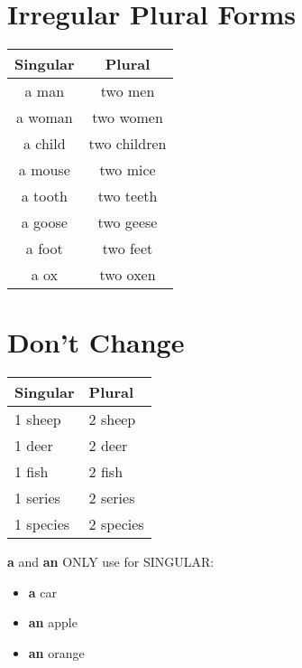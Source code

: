 \documentclass{elegantbook}
\begin{document}
    \section{Irregular Plural Forms}
    \begin{center}
        \begin{tabular}{c|c}
            \textbf{Singular}&\textbf{Plural}\\
            \hline
            a man&two men\\
            a woman&two women\\
            a child&two children\\
            a mouse&two mice\\
            a tooth&two teeth\\
            a goose&two geese\\
            a foot&two feet\\
            a ox&two oxen\\
        \end{tabular}
    \end{center}
    \section{Don't Change}
    \begin{center}
        \begin{tabular}{l|l}
            \textbf{Singular}&\textbf{Plural}\\
            \hline
            1 sheep&2 sheep\\
            1 deer&2 deer\\
            1 fish&2 fish\\
            1 series&2 series\\
            1 species&2 species\\
        \end{tabular}
    \end{center}

    \begin{note}
        \textbf{a} and \textbf{an} ONLY use for SINGULAR:
        \begin{itemize}
            \item \textbf{a} car
            \item \textbf{an} apple
            \item \textbf{an} orange
        \end{itemize}
    \end{note}
\end{document}
